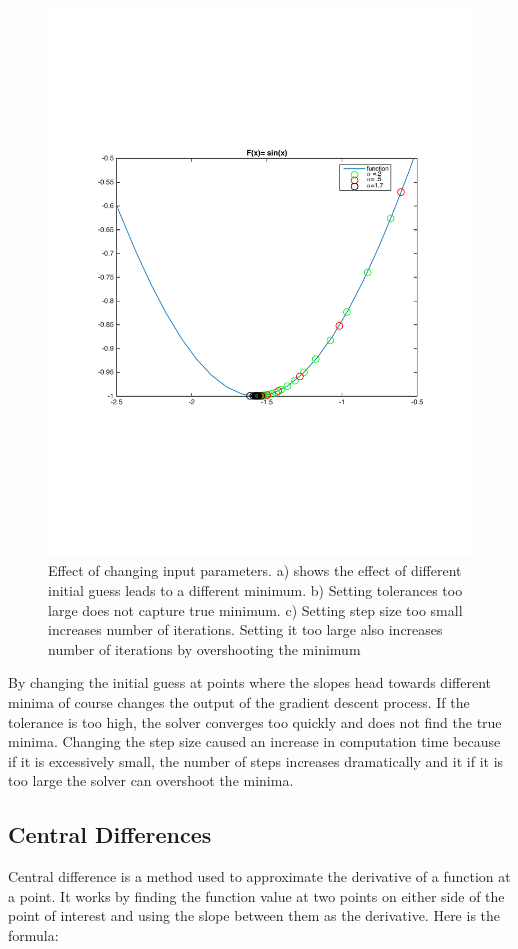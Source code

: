 \documentclass[10pt,twocolumn]{article}
\begin{document}
\begin{figure}[H]
\includegraphics[scale=.3]{1DsinStepSize.pdf}
\caption{ Effect of changing input parameters. a) shows the effect of different initial guess leads to a different minimum. b) Setting tolerances too large does not capture true minimum. c) Setting step size too small increases number of iterations. Setting it too large also increases number of iterations by overshooting the minimum}
\end{figure}
By changing the initial guess at points where the slopes head towards different minima of course changes the output of the gradient descent process. If the tolerance is too high, the solver converges too quickly and does not find the true minima.  Changing the step size caused an increase in computation time because if it is excessively small, the number of steps increases dramatically and it if it is too large the solver can overshoot the minima. 

\subsection*{ Central Differences}
Central difference is a method used to approximate the derivative of a function at a point. It works by finding the function value at two points on either side of the point of interest and using the slope between them as the derivative. Here is the formula:
\end{document}
